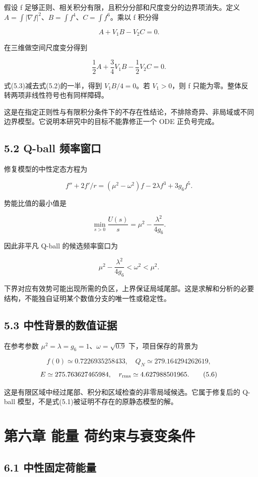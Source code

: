 \documentclass[UTF8,fontset=fandol,11pt]{ctexart}
\begin{document}
假设 f 足够正则、相关积分有限，且积分分部和尺度变分的边界项消失。定义
\(A=\int|\nabla f|^2\)、\(B=\int f^4\)、\(C=\int f^6\)。乘以 f 积分得

\[
A+V_1B-V_2C=0.
\tag{5.2}
\]

在三维做空间尺度变分得到

\[
\frac12A+\frac34V_1B-\frac12V_2C=0.
\tag{5.3}
\]

式(5.3)减去式(5.2)的一半，得到 \(V_1B/4=0\)。若 \(V_1>0\)，则 f 只能为零。整体反转两项非线性符号也有同样障碍。

这是在指定正则性与有限积分条件下的不存在性结论，不排除奇异、非局域或不同边界模型。它说明本研究中的目标不能靠修正一个 ODE 正负号完成。

\subsection*{5.2 Q-ball 频率窗口}

修复模型的中性定态方程为

\[
f''+2f'/r=(\mu^2-\omega^2)f-2\lambda f^3+3g_6f^5.
\]

势能比值的最小值是

\[
\min_{s>0}\frac{U(s)}s=\mu^2-\frac{\lambda^2}{4g_6}.
\tag{5.4}
\]

因此非平凡 Q-ball 的候选频率窗口为

\[
\mu^2-\frac{\lambda^2}{4g_6}<\omega^2<\mu^2.
\tag{5.5}
\]

下界对应有效势可能出现所需的负区，上界保证局域尾部。这是求解和分析的必要结构，不能独自证明某个数值分支的唯一性或稳定性。

\subsection*{5.3 中性背景的数值证据}

在参考参数 \(\mu^2=\lambda=g_6=1\)、\(\omega=\sqrt{0.9}\) 下，项目保存的背景为

\[
f(0)\simeq0.7226935258433,\quad Q_N\simeq279.164294262619,
\]
\[
E\simeq275.763627465984,\quad r_{\rm rms}\simeq4.627988501965.
\tag{5.6}
\]

这是有限区域中经过尾部、积分和区域检查的非零局域候选。它属于修复后的 Q-ball 模型，不是式(5.1)被证明不存在的原静态模型的解。

\section*{第六章 能量 荷约束与衰变条件}

\subsection*{6.1 中性固定荷能量}
\end{document}
